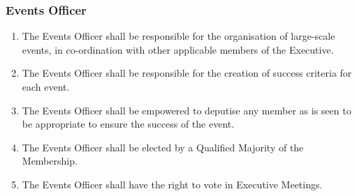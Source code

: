 \documentclass{scrartcl}
\begin{document}
            \subsubsection{Events Officer}
                \label{executive--positions--events-officer}
                \begin{enumerate}
                    \item The Events Officer shall be responsible for the organisation of large-scale events, in co-ordination with other applicable members of the Executive.
                    \item The Events Officer shall be responsible for the creation of success criteria for each event.
                    \item The Events Officer shall be empowered to deputise any member as is seen to be appropriate to ensure the success of the event.
                    \item The Events Officer shall be elected by a Qualified Majority of the Membership.
                    \item The Events Officer shall have the right to vote in Executive Meetings.
                \end{enumerate}
\end{document}
